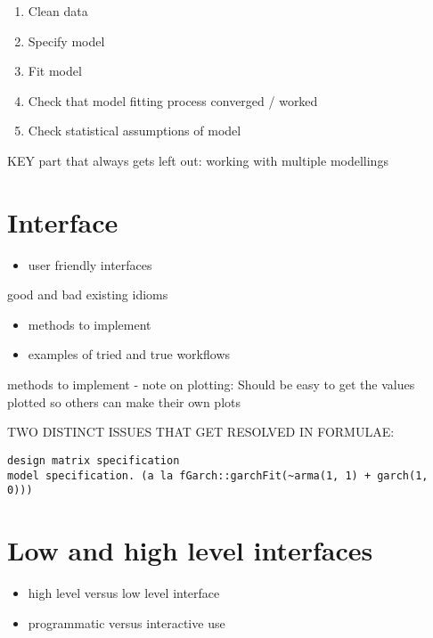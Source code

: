 \documentclass[]{book}
\providecommand{\tightlist}{%
  \setlength{\itemsep}{0pt}\setlength{\parskip}{0pt}}
\theoremstyle{definition}
\theoremstyle{definition}
\theoremstyle{definition}
\theoremstyle{remark}
\begin{document}
\begin{enumerate}
\def\labelenumi{\arabic{enumi}.}
\tightlist
\item
  Clean data
\item
  Specify model
\item
  Fit model
\item
  Check that model fitting process converged / worked
\item
  Check statistical assumptions of model
\end{enumerate}

KEY part that always gets left out: working with multiple modellings

\chapter{Interface}\label{interface}

\begin{itemize}
\tightlist
\item
  user friendly interfaces
\end{itemize}

good and bad existing idioms

\begin{itemize}
\tightlist
\item
  methods to implement
\item
  examples of tried and true workflows
\end{itemize}

methods to implement - note on plotting: Should be easy to get the
values plotted so others can make their own plots

TWO DISTINCT ISSUES THAT GET RESOLVED IN FORMULAE:

\begin{verbatim}
design matrix specification
model specification. (a la fGarch::garchFit(~arma(1, 1) + garch(1, 0)))
\end{verbatim}

\chapter{Low and high level
interfaces}\label{low-and-high-level-interfaces}

\begin{itemize}
\tightlist
\item
  high level versus low level interface
\item
  programmatic versus interactive use
\end{itemize}
\end{document}

